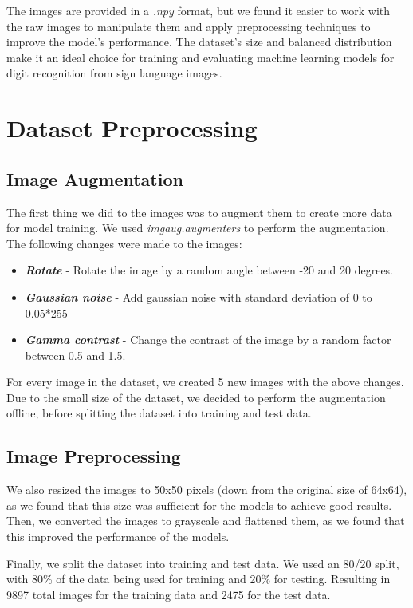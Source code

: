 \documentclass[conference]{IEEEtran}
\begin{document}
The images are provided in a \textit{.npy} format, but we found it easier to work with the raw images to manipulate them and apply preprocessing techniques to improve the model's performance. The dataset's size and balanced distribution make it an ideal choice for training and evaluating machine learning models for digit recognition from sign language images.

\section{Dataset Preprocessing}

\subsection{Image Augmentation}
The first thing we did to the images was to augment them to create more data for model training. 
We used \textit{imgaug.augmenters} \cite{imgaug} to perform the augmentation. 
The following changes were made to the images:
\begin{itemize}
    \item \textit{\textbf{Rotate}} - Rotate the image by a random angle between -20 and 20 degrees.
    \item \textit{\textbf{Gaussian noise}} - Add gaussian noise with standard deviation of 0 to 0.05*255
    \item \textit{\textbf{Gamma contrast}} - Change the contrast of the image by a random factor between 0.5 and 1.5.
\end{itemize}
For every image in the dataset, we created 5 new images with the above changes. Due to the small size of the dataset, we decided to perform the augmentation offline, before splitting the dataset into training and test data.

\subsection{Image Preprocessing}
We also resized the images to 50x50 pixels (down from the original size of 64x64), as we found that this size was sufficient for the models to achieve good results. Then, we converted the images to grayscale and flattened them, as we found that this improved the performance of the models.

Finally, we split the dataset into training and test data. We used an 80/20 split, with 80\% of the data being used for training and 20\% for testing.
Resulting in 9897 total images for the training data and 2475 for the test data.
\end{document}
